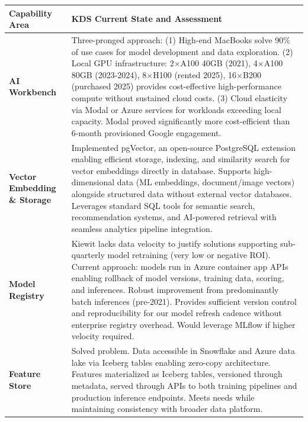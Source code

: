 \documentclass[12pt, a4paper]{article}
\begin{document}
{\footnotesize
\renewcommand{\arraystretch}{1.25}
\begin{tabularx}{\textwidth}{@{}
  >{\raggedright\arraybackslash}p{2.8cm}
  >{\raggedright\arraybackslash}X@{}}
\toprule
\textbf{Capability Area} & \textbf{KDS Current State and Assessment} \\
\midrule

\textbf{AI Workbench} &
Three-pronged approach: (1) High-end MacBooks solve 90\% of use cases for model development and data exploration. (2) Local GPU infrastructure: 2$\times$A100 40GB (2021), 4$\times$A100 80GB (2023-2024), 8$\times$H100 (rented 2025), 16$\times$B200 (purchased 2025) provides cost-effective high-performance compute without sustained cloud costs. (3) Cloud elasticity via Modal or Azure services for workloads exceeding local capacity. Modal proved significantly more cost-efficient than 6-month provisioned Google engagement. \\
\midrule

\textbf{Vector Embedding \& Storage} &
Implemented pgVector, an open-source PostgreSQL extension enabling efficient storage, indexing, and similarity search for vector embeddings directly in database. Supports high-dimensional data (ML embeddings, document/image vectors) alongside structured data without external vector databases. Leverages standard SQL tools for semantic search, recommendation systems, and AI-powered retrieval with seamless analytics pipeline integration. \\
\midrule

\textbf{Model Registry} &
Kiewit lacks data velocity to justify solutions supporting sub-quarterly model retraining (very low or negative ROI). Current approach: models run in Azure container app APIs enabling rollback of model versions, training data, scoring, and inferences. Robust improvement from predominantly batch inferences (pre-2021). Provides sufficient version control and reproducibility for our model refresh cadence without enterprise registry overhead. Would leverage MLflow if higher velocity required. \\
\midrule

\textbf{Feature Store} &
Solved problem. Data accessible in Snowflake and Azure data lake via Iceberg tables enabling zero-copy architecture. Features materialized as Iceberg tables, versioned through metadata, served through APIs to both training pipelines and production inference endpoints. Meets needs while maintaining consistency with broader data platform. \\
\midrule


\end{tabularx}}
\end{document}
